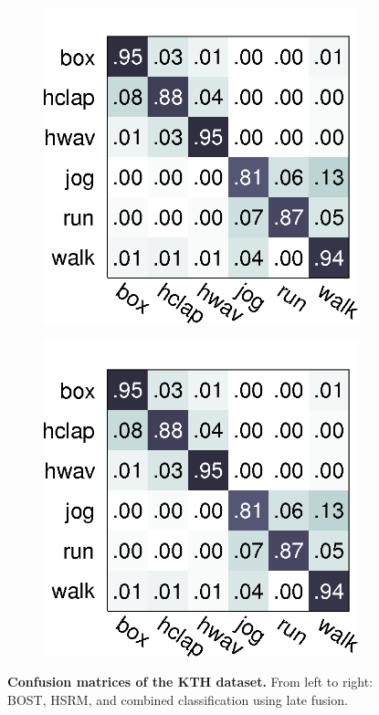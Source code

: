 \begin{figure}[ht]
\begin{subfigure}[t]{0.32\linewidth}
	\includegraphics[width=1\linewidth]{fig/act/bost.png}
\end{subfigure}
\begin{subfigure}[t]{0.32\linewidth} \centering 
	\includegraphics[width=1\linewidth]{fig/act/bost.png}
\end{subfigure}
\caption{\textbf{Confusion matrices of the KTH dataset.} From left to right: BOST, HSRM, and combined classification using late fusion.}
\label{fig/act/confusion}
\end{figure}


